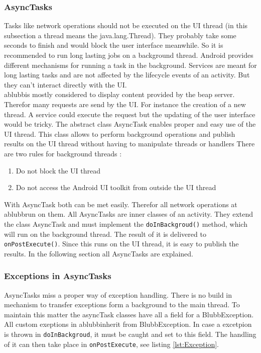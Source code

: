 \documentclass[12pt,a4paper,oneside]{report}
\newcommand{\appname}{ablubb}
\newcommand{\code}[1]{\lstinline{#1}}
\begin{document}
\subsubsection{AsyncTasks}
Tasks like network operations should not be executed on the UI thread (in this subsection a thread means the java.lang.Thread). They probably take some seconds to finish and would block the user interface meanwhile. So it is recommended to run long lasting jobs on a background thread. 
Android provides different mechanisms for running a task in the background.
Services are meant for long lasting tasks and are not affected by the lifecycle events of an activity. But they can't interact directly with the UI. \\
\appname  is mostly considered to display content provided by the beap server. Therefor many requests are send by the UI. For instance the creation of a new thread. A service could execute the request but the updating of the user interface would be tricky. The abstract class AsyncTask enables proper and easy use of the UI thread. This class allows to perform background operations and publish results on the UI thread without having to manipulate threads or handlers\citep{aDefAsyncTask}
There are two rules for background threads
\citep{aDefProcThreads}:
\begin{enumerate}
	\item Do not block the UI thread
	\item Do not access the Android UI toolkit from outside the UI thread
\end{enumerate}
With AsyncTask both can be met easily. Therefor all network operations at \appname  run on them. All AsyncTasks are inner classes of an activity. They extend the class AsyncTask and must implement the \code{doInBackgroud()} method, which will run on the background thread. The result of it is delivered to \code{onPostExecute()}. Since this runs on the UI thread, it is easy to publish the results. In the following section all AsyncTasks are explained.

\subsubsection{Exceptions in AsyncTasks}
AsyncTasks miss a proper way of exception handling. There is no build in mechanism to transfer exceptions form a background to the main thread. To maintain this matter the asyncTask classes have all a field for a BlubbException. All custom exeptions in \appname  inherit from BlubbException. In case a excetpion is thrown in \code{doInBackgroud}, it must be caught and set to this field. The handling of it can then take place in \code{onPostExecute}, see listing \ref{lst:Exception}.
\end{document}
